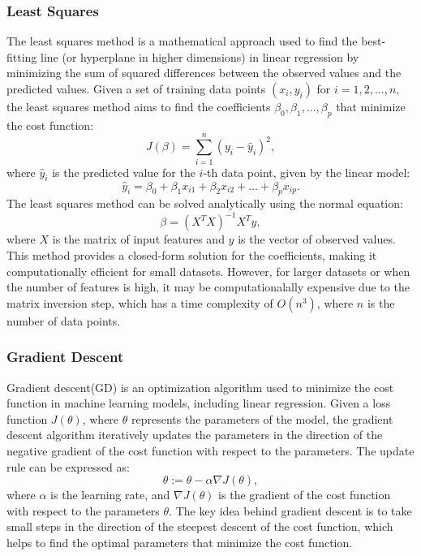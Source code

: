 \documentclass{article}
\begin{document}
\subsubsection{Least Squares}
The least squares method is a mathematical approach used to find the best-fitting line (or hyperplane in higher dimensions) in linear regression
by minimizing the sum of squared differences between the observed values and the predicted values.
Given a set of training data points $(x_i, y_i)$ for $i = 1, 2, \ldots, n$, the least squares method aims to find the coefficients $\beta_0, \beta_1, \ldots, \beta_p$ that minimize the cost function:
\begin{equation}
    J(\beta) = \sum_{i=1}^{n} (y_i - \hat{y}_i)^2,
\end{equation}
where $\hat{y}_i$ is the predicted value for the $i$-th data point, given by the linear model:
\begin{equation}
    \hat{y}_i = \beta_0 + \beta_1 x_{i1} + \beta_2 x_{i2} + \ldots + \beta_p x_{ip}.
\end{equation}
The least squares method can be solved analytically using the normal equation:
\begin{equation}
    \beta = (X^T X)^{-1} X^T y,
\end{equation}
where $X$ is the matrix of input features and $y$ is the vector of observed values.
This method provides a closed-form solution for the coefficients, making it computationally efficient for small datasets.
However, for larger datasets or when the number of features is high, it may be computationalally expensive due to the matrix inversion step,
which has a time complexity of $O(n^3)$, where $n$ is the number of data points.


\subsubsection{Gradient Descent}
Gradient descent(GD) is an optimization algorithm used to minimize the cost function in machine learning models,
 including linear regression.
Given a loss function $J(\theta)$, where $\theta$ represents the parameters of the model,
 the gradient descent algorithm iteratively updates the parameters in the direction of the negative gradient of the cost function with respect to the parameters. The update rule can be expressed as:
\begin{equation}
    \theta := \theta - \alpha \nabla J(\theta),
\end{equation}
where $\alpha$ is the learning rate, and $\nabla J(\theta)$ is the gradient of the cost function with respect to the parameters $\theta$.
The key idea behind gradient descent is to take small steps in the direction of the steepest descent of the cost function,
which helps to find the optimal parameters that minimize the cost function.
\end{document}
